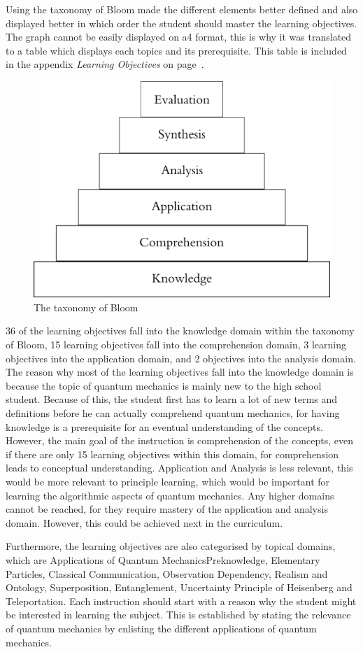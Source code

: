\documentclass[11pt,twoside]{report} %
\begin{document}
Using the taxonomy of Bloom made the different elements better defined and also displayed better in which order the student should master the learning objectives. The graph cannot be easily displayed on a4 format, this is why it was translated to a table which displays each topics and its prerequisite. This table is included in the appendix \emph{Learning Objectives} on page~\pageref{app:learningobjectives}.

\begin{figure}[h]
\centering
\includegraphics[width=.4\textwidth]{bloom}
\caption{The taxonomy of Bloom \protect\cite{bloom}\label{fig:bloom}}
\end{figure}

36 of the learning objectives fall into the knowledge domain within the taxonomy of Bloom, 15 learning objectives fall into the comprehension domain, 3 learning objectives into the application domain, and 2 objectives into the analysis domain. The reason why most of the learning objectives fall into the knowledge domain is because the topic of quantum mechanics is mainly new to the high school student. Because of this, the student first has to learn a lot of new terms and definitions before he can actually comprehend quantum mechanics, for having knowledge is a prerequisite for an eventual understanding of the concepts. However, the main goal of the instruction is comprehension of the concepts, even if there are only 15 learning objectives within this domain, for comprehension leads to conceptual understanding. Application and Analysis is less relevant, this would be more relevant to principle learning, which would be important for learning the algorithmic aspects of quantum mechanics. Any higher domains cannot be reached, for they require mastery of the application and analysis domain. However, this could be achieved next in the curriculum.

Furthermore, the learning objectives are also categorised by topical domains, which are Applications of Quantum MechanicsPreknowledge, Elementary Particles, Classical Communication, Observation Dependency, Realism and Ontology, Superposition, Entanglement, Uncertainty Principle of Heisenberg and Teleportation. Each instruction should start with a reason why the student might be interested in learning the subject. This is established by stating the relevance of quantum mechanics by enlisting the different applications of quantum mechanics.
\end{document}
